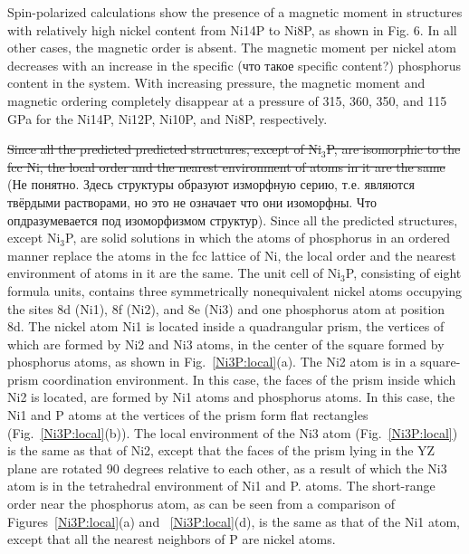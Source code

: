 \documentclass[twoside,twocolumn,9pt]{article}
\begin{document}
Spin-polarized calculations show the presence of a magnetic moment in structures with relatively high nickel content from Ni14P to Ni8P, as shown in Fig. 6. In all other cases, the magnetic order is absent. The magnetic moment per nickel atom decreases with an increase in the specific (что такое specific content?) phosphorus content in the system. With increasing pressure, the magnetic moment and magnetic ordering completely disappear at a pressure of 315, 360, 350, and 115 GPa for the Ni14P, Ni12P, Ni10P, and Ni8P, respectively.


 



\st{Since all the predicted predicted structures, except of Ni$_3$P, are isomorphic to the fcc Ni, the local order and the nearest environment of atoms in it are the same}
{\color{red}(Не  понятно. Здесь структуры образуют изморфную серию, т.е. являются твёрдыми растворами, но это не означает что они изоморфны. Что опдразумевается под изоморфизмом структур)}. 
{\color{blue}Since all the predicted structures, except Ni$_3$P, are solid solutions in which the atoms of phosphorus in an ordered manner replace the atoms in the fcc lattice of Ni, the local order and the nearest environment of atoms in it are the same.}
The unit cell of Ni$_3$P, consisting of eight formula units, contains three symmetrically nonequivalent nickel atoms occupying the sites 8d (Ni1), 8f (Ni2), and 8e (Ni3) and one phosphorus atom at position 8d. 
The nickel atom Ni1 is located inside a quadrangular prism, the vertices of which are formed by Ni2 and Ni3 atoms, in the center of the square formed by phosphorus atoms, as shown in Fig.~\ref{Ni3P:local}(a). 
The Ni2 atom is in a square-prism coordination environment. In this case, the faces of the prism inside which Ni2 is located, are formed by Ni1 atoms and phosphorus atoms. In this case, the Ni1 and P atoms at the vertices of the prism form flat rectangles (Fig.~\ref{Ni3P:local}(b)).
The local environment of the Ni3 atom (Fig.~\ref{Ni3P:local}) is the same as that of Ni2, except that the faces of the prism lying in the YZ plane are rotated 90 degrees relative to each other, as a result of which the Ni3 atom is in the tetrahedral environment of Ni1 and P. atoms. The short-range order near the phosphorus atom, as can be seen from a comparison of Figures~\ref{Ni3P:local}(a) and ~\ref{Ni3P:local}(d), is the same as that of the Ni1 atom, except that all the nearest neighbors of P are nickel atoms.
\end{document}

